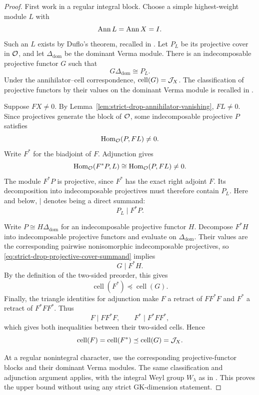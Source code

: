 \begin{proof}
First work in a regular integral block. Choose a simple highest-weight
module $L$ with
\[
  \operatorname{Ann} L=\operatorname{Ann} X=I.
\]
Such an $L$ exists by Duflo's theorem, recalled in
\cite[\S2.1]{MackaayMazorchukMiemietz2024}. Let $P_L$ be its projective
cover in $\mathcal{O}$, and let $\Delta_{\mathrm{dom}}$ be the dominant Verma module.
There is an indecomposable projective functor $G$ such that
\[
  G\Delta_{\mathrm{dom}}\cong P_L.
\]
Under the annihilator--cell correspondence,
$\operatorname{cell}(G)=\mathcal{J}_X$. The classification of projective functors
by their values on the dominant Verma module is recalled in
\cite[\S2.2]{MackaayMazorchukMiemietz2024}.

Suppose $FX\neq0$. By
Lemma~\ref{lem:strict-drop-annihilator-vanishing}, $FL\neq0$. Since
projectives generate the block of $\mathcal{O}$, some indecomposable projective
$P$ satisfies
\[
  \operatorname{Hom}_{\mathcal{O}}(P,FL)\neq0.
\]
Write $F^*$ for the biadjoint of $F$. Adjunction gives
\[
  \operatorname{Hom}_{\mathcal{O}}(F^*P,L)\cong\operatorname{Hom}_{\mathcal{O}}(P,FL)\neq0.
\]
The module $F^*P$ is projective, since $F^*$ has the exact right adjoint
$F$. Its decomposition into indecomposable projectives must therefore
contain $P_L$. Here and below, $\mid$ denotes being a direct summand:
\begin{equation}\label{eq:strict-drop-projective-cover-summand}
  P_L\mid F^*P.
\end{equation}

Write $P\cong H\Delta_{\mathrm{dom}}$ for an indecomposable projective
functor $H$. Decompose $F^*H$ into indecomposable projective functors and
evaluate on $\Delta_{\mathrm{dom}}$. Their values are the corresponding
pairwise nonisomorphic indecomposable projectives, so
\eqref{eq:strict-drop-projective-cover-summand} implies
\[
  G\mid F^*H.
\]
By the definition of the two-sided preorder, this gives
\[
  \operatorname{cell}(F^*)\preceq\operatorname{cell}(G).
\]
Finally, the triangle identities for adjunction make $F$ a retract of
$FF^*F$ and $F^*$ a retract of $F^*FF^*$. Thus
\[
  F\mid FF^*F,\qquad F^*\mid F^*FF^*,
\]
which gives both inequalities between their two-sided cells. Hence
\[
  \operatorname{cell}(F)=\operatorname{cell}(F^*)
  \preceq\operatorname{cell}(G)=\mathcal{J}_X.
\]

At a regular nonintegral character, use the corresponding
projective-functor blocks and their dominant Verma modules. The same
classification and adjunction argument applies, with the integral Weyl
group $W_\lambda$ as in
\cite[\S2.4]{MackaayMazorchukMiemietz2024}. This proves the upper bound
without using any strict GK-dimension statement.
\end{proof}

